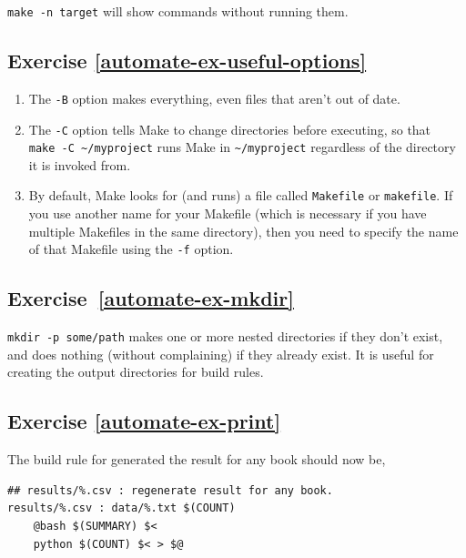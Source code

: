 \documentclass[
]{krantz}
\begin{document}
\texttt{make\ -n\ target} will show commands without running them.

\hypertarget{exercise-refautomate-ex-useful-options}{%
\subsection*{Exercise \ref{automate-ex-useful-options}}\label{exercise-refautomate-ex-useful-options}}


\begin{enumerate}
\def\labelenumi{\arabic{enumi}.}
\item
  The \texttt{-B} option makes everything, even files that aren't out of date.
\item
  The \texttt{-C} option tells Make to change directories before executing,
  so that \texttt{make\ -C\ \textasciitilde{}/myproject} runs Make in \texttt{\textasciitilde{}/myproject}
  regardless of the directory it is invoked from.
\item
  By default, Make looks for (and runs) a file called \texttt{Makefile} or \texttt{makefile}.
  If you use another name for your Makefile
  (which is necessary if you have multiple Makefiles in the same directory),
  then you need to specify the name of that Makefile using the \texttt{-f} option.
\end{enumerate}

\hypertarget{exercise-refautomate-ex-mkdir}{%
\subsection*{Exercise~\ref{automate-ex-mkdir}}\label{exercise-refautomate-ex-mkdir}}


\texttt{mkdir\ -p\ some/path} makes one or more nested directories if they don't exist,
and does nothing (without complaining) if they already exist.
It is useful for creating the output directories for build rules.

\hypertarget{exercise-refautomate-ex-print}{%
\subsection*{Exercise \ref{automate-ex-print}}\label{exercise-refautomate-ex-print}}


The build rule for generated the result for any book should now be,

\begin{verbatim}
## results/%.csv : regenerate result for any book.
results/%.csv : data/%.txt $(COUNT)
    @bash $(SUMMARY) $<
    python $(COUNT) $< > $@
\end{verbatim}
\end{document}
